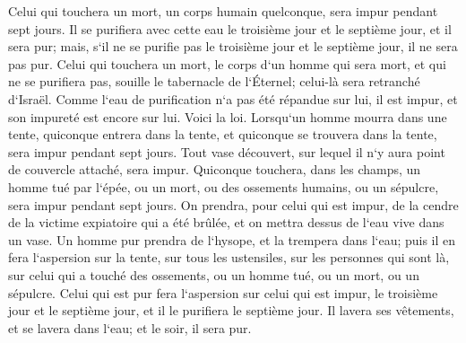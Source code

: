 \verse Celui qui touchera un mort, un corps humain quelconque, sera impur pendant sept jours. 
\verse Il se purifiera avec cette eau le troisième jour et le septième jour, et il sera pur; mais, s`il ne se purifie pas le troisième jour et le septième jour, il ne sera pas pur. 
\verse Celui qui touchera un mort, le corps d`un homme qui sera mort, et qui ne se purifiera pas, souille le tabernacle de l`Éternel; celui-là sera retranché d`Israël. Comme l`eau de purification n`a pas été répandue sur lui, il est impur, et son impureté est encore sur lui. 
\verse Voici la loi. Lorsqu`un homme mourra dans une tente, quiconque entrera dans la tente, et quiconque se trouvera dans la tente, sera impur pendant sept jours. 
\verse Tout vase découvert, sur lequel il n`y aura point de couvercle attaché, sera impur. 
\verse Quiconque touchera, dans les champs, un homme tué par l`épée, ou un mort, ou des ossements humains, ou un sépulcre, sera impur pendant sept jours. 
\verse On prendra, pour celui qui est impur, de la cendre de la victime expiatoire qui a été brûlée, et on mettra dessus de l`eau vive dans un vase. 
\verse Un homme pur prendra de l`hysope, et la trempera dans l`eau; puis il en fera l`aspersion sur la tente, sur tous les ustensiles, sur les personnes qui sont là, sur celui qui a touché des ossements, ou un homme tué, ou un mort, ou un sépulcre. 
\verse Celui qui est pur fera l`aspersion sur celui qui est impur, le troisième jour et le septième jour, et il le purifiera le septième jour. Il lavera ses vêtements, et se lavera dans l`eau; et le soir, il sera pur. 
